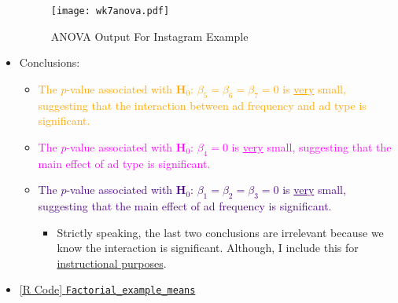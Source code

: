 \begin{itemize}
\begin{figure}[!htbp]
                  \centering
                  \texttt{[image: wk7anova.pdf]}
                  \caption{ANOVA Output For Instagram Example}\label{wk7anova}
            \end{figure}
      \item Conclusions:
            \begin{itemize}
                  \item \textcolor{Orange}{The $ p $-value associated with $ \mathbf{H}_0 $: $ \beta_5=\beta_6=\beta_7=0 $ is \underline{very} small, suggesting that the interaction
                              between ad frequency and ad type is significant.}
                  \item \textcolor{Fuchsia}{The $ p $-value associated with $ \mathbf{H}_0 $: $ \beta_4=0 $ is \underline{very} small, suggesting that the main effect of ad type is significant.}
                  \item \textcolor{Indigo}{The $ p $-value associated with $ \mathbf{H}_0 $: $ \beta_1=\beta_2=\beta_3=0 $ is \underline{very} small, suggesting that the main effect of ad frequency is significant.}
                        \begin{itemize}
                              \item Strictly speaking, the last two conclusions are irrelevant because we know the interaction is significant. Although, I include this for \underline{instructional purposes}.
                        \end{itemize}
            \end{itemize}
      \item \href{https://github.com/Hextical/university-notes/blob/master/year-3/semester-3/STAT 430/code/W7/Factorial_example_means.R}{[R Code] \texttt{Factorial\_example\_means}}
\end{itemize}
